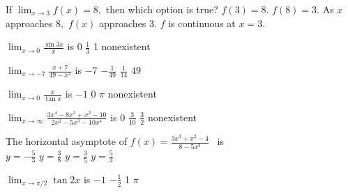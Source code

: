 \begin{question}
If \(\lim_{x \to 3} f(x) = 8,\) then which option is true?
\choices
{\(f(3) = 8.\)}
{}
{\(f(8) = 3.\)} 
{As \(x\) approaches \(8,\) \(f(x)\) approaches \(3.\)} 
{\(f\) is continuous at \(x = 3.\)}
\end{question}

\begin{question}
\(\lim_{x \to 0} \frac{\sin 3x}{x}\) is 
\choicesline
{\(0\)}
{\(\frac{1}{3}\)}
{1}
{}
{nonexistent}
\end{question}

\begin{question}
\(\lim_{x \to -7} \frac{x + 7}{49 - x^2}\) is 
\choicesline
{\(-7\)}
{}
{\(-\frac{1}{49}\)}
{\(\frac{1}{14}\)}
{\(49\)}
\end{question}

\begin{question}
\(\lim_{x \to 0} \frac{x}{\tan x}\) is 
\choicesline
{\(-1\)}
{0}
{}
{\(\pi\)}
{nonexistent}
\end{question}

\begin{question}
\(\lim_{x \to \infty} \frac{3x^4 - 8x^3 + x^2 - 10}{2x^2 - 5x^3 - 10x^4}\) is 
\choicesline
{}
{\(0\)}
{\(\frac{3}{10}\)}
{\(\frac{3}{2}\)}
{nonexistent}
\end{question}

\begin{question}
The horizontal asymptote of \(f(x) = \frac{3x^3 + x^2 - 4}{8 - 5x^3}\) \, is \\
\choicesline
{\(y = -\frac{5}{3}\)}
{}
{\(y = \frac{3}{8}\)}
{\(y = \frac{3}{5}\)}
{\(y = \frac{5}{3}\)}
\end{question}

\begin{question}
\(\lim_{x \to \pi/2} \tan 2x\) is
\choicesline
{\(-1\)}
{\(-\frac{1}{2}\)}
{}
{1}
{\(\pi\)}
\end{question}

